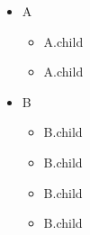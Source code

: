 \begin{itemize}

    \item A
    \begin{itemize}

        \item A.child


        \item A.child
    \end{itemize}


    \item B
    \begin{itemize}

        \item B.child


        \item B.child


        \item B.child

        \item B.child

    \end{itemize}
\end{itemize}
